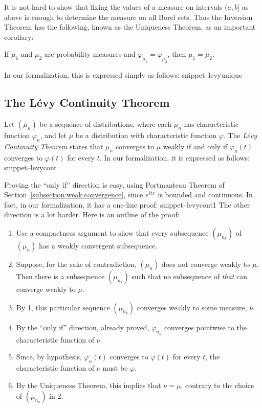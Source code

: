 \documentclass{svjour3}
\newcommand{\ph}{\varphi}
\newcommand{\Snippet}[1]{\csname snippet--#1\endcsname}
\begin{document}
It is not hard to show that fixing the values of a measure on intervals $(a, b]$ as above is enough to determine the measure on all Borel sets. Thus the Inversion Theorem has the following, known as the Uniqueness Theorem, as an important corollary:
\begin{theorem}
If $\mu_1$ and $\mu_2$ are probability measures and $\ph_{\mu_1} = \ph_{\mu_2}$, then $\mu_1 = \mu_2$. 
\end{theorem}
In our formalization, this is expressed simply as follows:
\Snippet{levyunique}

\subsection{The L\'evy Continuity Theorem}

Let $(\mu_n)$ be a sequence of distributions, where each $\mu_n$ has characteristic function $\ph_n$, and let $\mu$ be a distribution with characteristic function $\ph$. The \emph{L\'evy Continuity Theorem} states that $\mu_n$ converges to $\mu$ weakly if and only if $\ph_n(t)$ converges to $\ph(t)$ for every $t$. In our formalization, it is expressed as follows:
\Snippet{levycont }

Proving the ``only if'' direction is easy, using Portmanteau Theorem of Section~\ref{subsection:weak:convergence}, since $e^{itx}$ is bounded and continuous. In fact, in our formalization, it has a one-line proof:
\Snippet{levycont1}
The other direction is a lot harder. Here is an outline of the proof:
\begin{enumerate}
 \item Use a compactness argument to show that every subsequence $(\mu_{n_k})$ of $(\mu_n)$ has a weakly convergent subsequence.
 \item Suppose, for the sake of contradiction, $(\mu_n)$ does not converge weakly to $\mu$. Then there is a subsequence $(\mu_{n_k})$ such that no subsequence of \emph{that} can converge weakly to $\mu$.
 \item By 1, this particular sequence $(\mu_{n_k})$ converges weakly to some measure, $\nu$. 
 \item By the ``only if'' direction, already proved, $\ph_{n_k}$ converges pointwise to the characteristic function of $\nu$.
 \item Since, by hypothesis, $\ph_n(t)$ converges to $\ph(t)$ for every $t$, the characteristic function of $\nu$ must be $\ph$.
 \item By the Uniqueness Theorem, this implies that $\nu = \mu$, contrary to the choice of $(\mu_{n_k})$ in 2.
\end{enumerate}
\end{document}
